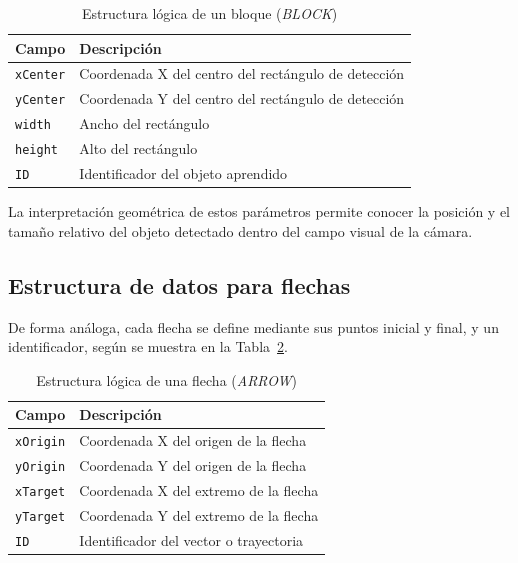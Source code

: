 \documentclass{prgrado}
\begin{document}
\begin{table}[htbp]
\centering
\caption{Estructura lógica de un bloque (\emph{BLOCK})}
\label{tab:block_campos}
\begin{tabular}{|l|l|}
\hline
\textbf{Campo} & \textbf{Descripción} \\ \hline
\texttt{xCenter} & Coordenada X del centro del rectángulo de detección \\ \hline
\texttt{yCenter} & Coordenada Y del centro del rectángulo de detección \\ \hline
\texttt{width}   & Ancho del rectángulo \\ \hline
\texttt{height}  & Alto del rectángulo \\ \hline
\texttt{ID}      & Identificador del objeto aprendido \\ \hline
\end{tabular}
\end{table}

La interpretación geométrica de estos parámetros permite conocer la posición y
el tamaño relativo del objeto detectado dentro del campo visual de la cámara.

\subsection{Estructura de datos para flechas}

De forma análoga, cada flecha se define mediante sus puntos inicial y final, y
un identificador, según se muestra en la Tabla~\ref{tab:arrow_campos}.

\begin{table}[htbp]
\centering
\caption{Estructura lógica de una flecha (\emph{ARROW})}
\label{tab:arrow_campos}
\begin{tabular}{|l|l|}
\hline
\textbf{Campo} & \textbf{Descripción} \\ \hline
\texttt{xOrigin} & Coordenada X del origen de la flecha \\ \hline
\texttt{yOrigin} & Coordenada Y del origen de la flecha \\ \hline
\texttt{xTarget} & Coordenada X del extremo de la flecha \\ \hline
\texttt{yTarget} & Coordenada Y del extremo de la flecha \\ \hline
\texttt{ID}      & Identificador del vector o trayectoria \\ \hline
\end{tabular}
\end{table}
\end{document}
